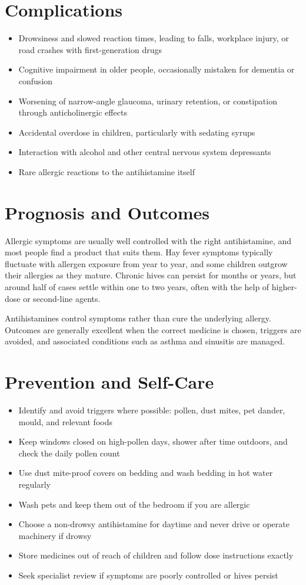 \section*{Complications}
\begin{itemize}
    \item Drowsiness and slowed reaction times, leading to falls, workplace injury, or road crashes with first-generation drugs
    \item Cognitive impairment in older people, occasionally mistaken for dementia or confusion
    \item Worsening of narrow-angle glaucoma, urinary retention, or constipation through anticholinergic effects
    \item Accidental overdose in children, particularly with sedating syrups
    \item Interaction with alcohol and other central nervous system depressants
    \item Rare allergic reactions to the antihistamine itself
\end{itemize}

\section*{Prognosis and Outcomes}
Allergic symptoms are usually well controlled with the right antihistamine, and most people find a product that suits them. Hay fever symptoms typically fluctuate with allergen exposure from year to year, and some children outgrow their allergies as they mature. Chronic hives can persist for months or years, but around half of cases settle within one to two years, often with the help of higher-dose or second-line agents.

Antihistamines control symptoms rather than cure the underlying allergy. Outcomes are generally excellent when the correct medicine is chosen, triggers are avoided, and associated conditions such as asthma and sinusitis are managed.

\section*{Prevention and Self-Care}
\begin{itemize}
    \item Identify and avoid triggers where possible: pollen, dust mites, pet dander, mould, and relevant foods
    \item Keep windows closed on high-pollen days, shower after time outdoors, and check the daily pollen count
    \item Use dust mite-proof covers on bedding and wash bedding in hot water regularly
    \item Wash pets and keep them out of the bedroom if you are allergic
    \item Choose a non-drowsy antihistamine for daytime and never drive or operate machinery if drowsy
    \item Store medicines out of reach of children and follow dose instructions exactly
    \item Seek specialist review if symptoms are poorly controlled or hives persist
\end{itemize}

